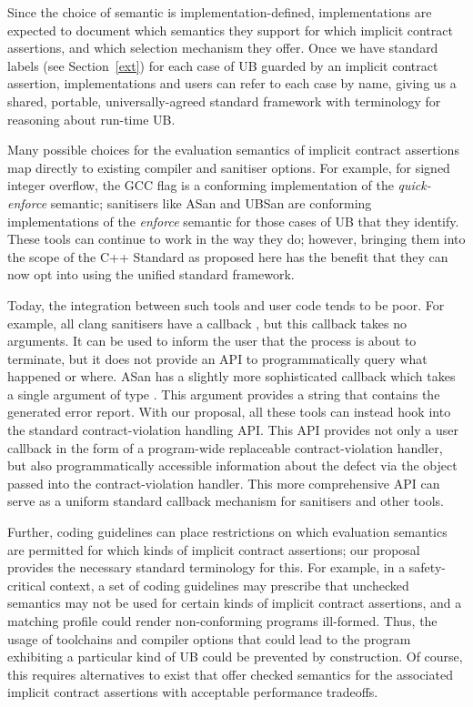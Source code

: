 Since the choice of semantic is implementation-defined, implementations are expected to document which semantics they support for which implicit contract assertions, and which selection mechanism they offer. Once we have standard labels (see Section~\ref{ext}) for each case of UB guarded by an implicit contract assertion, implementations and users can refer to each case by name, giving us a shared, portable, universally-agreed standard framework with terminology for reasoning about run-time UB.

Many possible choices for the evaluation semantics of implicit contract assertions map directly to existing compiler and sanitiser options. For example, for signed integer overflow, the GCC flag  is a conforming implementation of the \emph{quick-enforce} semantic; sanitisers like ASan and UBSan are conforming implementations of the \emph{enforce} semantic for those cases of UB that they identify. These tools can continue to work in the way they do; however, bringing them into the scope of the C++ Standard as proposed here has the benefit that they can now opt into using the unified standard framework.

Today, the integration between such tools and user code tends to be poor. For example, all clang sanitisers have a callback , but this callback takes no arguments. It can be used to inform the user that the process is about to terminate, but it does not provide an API to programmatically query what happened or where. ASan has a slightly more sophisticated callback  which takes a single argument of type . This argument provides a string that contains the generated error report. With our proposal, all these tools can instead hook into the standard contract-violation handling API. This API provides not only a user callback in the form of a  program-wide replaceable contract-violation handler, but also programmatically accessible information about the defect via the  \mbox{} object passed into the contract-violation handler. This more comprehensive API can serve as a uniform standard callback mechanism for sanitisers and other tools.

Further, coding guidelines can place restrictions on which evaluation semantics are permitted for which kinds of implicit contract assertions; our proposal provides the necessary standard terminology for this. For example, in a safety-critical context, a set of coding guidelines may prescribe that unchecked semantics may not be used for certain kinds of implicit contract assertions, and a matching profile could render non-conforming programs ill-formed. Thus, the usage of toolchains and compiler options that could lead to the program exhibiting a particular kind of UB could be prevented by construction. Of course, this requires alternatives to exist that offer checked semantics for the associated implicit contract assertions with acceptable performance tradeoffs.

